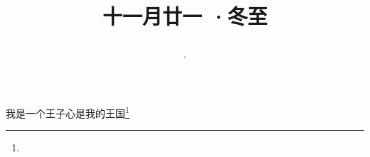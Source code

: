\title{\date[d=21,m=12,y=2024][year:cn-y,年,month:cn,day:cn,日,·,weekday]·十一月廿一 ·冬至}
我是一个王子心是我的王国\footnote{ }

